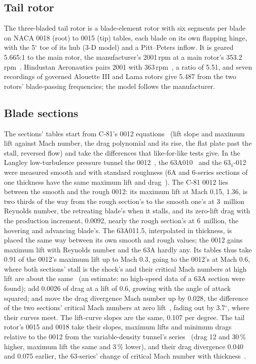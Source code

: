 \documentclass[10pt,a4paper,twocolumn]{article}
\begin{document}
\subsection{Tail rotor}
The three-bladed tail rotor is a blade-element rotor with six segments per blade on NACA 0018 (root) to 0015 (tip) tables, each blade on its own flapping
hinge, with the 5$^\circ$ toe of its hub (3-D model) and a Pitt--Peters inflow. It is geared 5.665:1 to the main rotor, the
manufacturer's 2001\,rpm at a main rotor's 353.2\,rpm~\cite{spec}. Hindustan Aeronautics pairs 2001 with 363\,rpm~\cite{hl}, a ratio of
5.51, and seven recordings of governed Alouette III and Lama rotors give 5.487 from the two rotors' blade-passing frequencies; the model
follows the manufacturer.

\subsection{Blade sections}\label{sec:sections}
The sections' tables start from C-81's 0012 equations~\cite{c81} (lift slope and maximum lift against Mach number, the drag
polynomial and its rise, the flat plate past the stall, reversed flow) and take the differences that like-for-like tests give. In the
Langley low-turbulence pressure tunnel the 0012~\cite{tm4074}, the 63A010~\cite{n903} and the 63$_1$-012~\cite{n824} were measured
smooth and with standard roughness (6A and 6-series sections of one thickness have the same maximum lift and drag~\cite{n903}). The
C-81 0012 lies between the smooth and the rough 0012: its maximum lift at Mach 0.15, 1.36, is two thirds of the way from the rough
section's to the smooth one's at 3~million Reynolds number, the retreating blade's when it stalls, and its zero-lift drag with the
production increment, 0.0092, nearly the rough section's at 6~million, the hovering and advancing blade's. The 63A011.5, interpolated
in thickness, is placed the same way between its own smooth and rough values; the 0012 gains maximum lift with Reynolds number and the
63A hardly any. Its tables thus take 0.91 of the 0012's maximum lift up to Mach 0.3, going to the 0012's at Mach 0.6, where both
sections' stall is the shock's and their critical Mach numbers at high lift are about the same~\cite{n824} (an estimate: no high-speed
data of a 63A section were found); add 0.0026 of drag at a lift of 0.6, growing with the angle of attack squared; and move the drag
divergence Mach number up by 0.028, the difference of the two sections' critical Mach numbers at zero lift~\cite{n824}, fading out by
3.7$^\circ$, where their curves meet. The lift-curve slopes are the same, 0.107 per degree. The tail rotor's 0015 and 0018 take their
slopes, maximum lifts and minimum drags relative to the 0012 from the variable-density tunnel's series~\cite{n460} (drag 12 and
30\,\% higher, maximum lift the same and 3\,\% lower), and their drag divergence 0.040 and 0.075 earlier, the 63-series' change of
critical Mach number with thickness~\cite{n824}.
\end{document}
